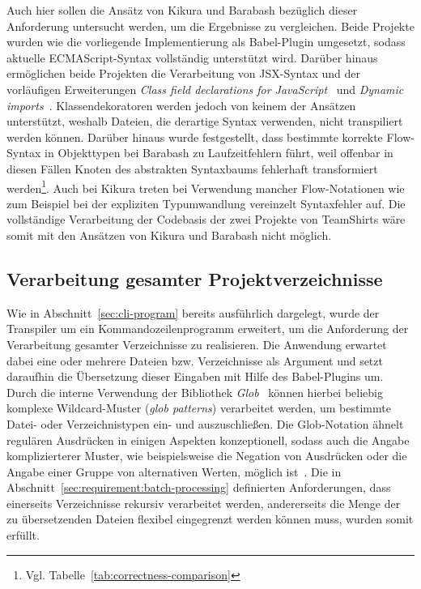 Auch hier sollen die Ansätz von Kikura und Barabash bezüglich dieser Anforderung untersucht werden, um die Ergebnisse zu vergleichen. Beide Projekte wurden wie die vorliegende Implementierung als Babel-Plugin umgesetzt, sodass aktuelle ECMAScript-Syntax vollständig unterstützt wird. Darüber hinaus ermöglichen beide Projekten die Verarbeitung von JSX-Syntax und der vorläufigen Erweiterungen \textit{Class field declarations for JavaScript}~\autocite{ES_PROPOSAL:CLASS_FIELDS} und \textit{Dynamic imports}~\autocite{ES_PROPOSAL:DYNAMIC_IMPORTS}. Klassendekoratoren werden jedoch von keinem der Ansätzen unterstützt, weshalb Dateien, die derartige Syntax verwenden, nicht transpiliert werden können. Darüber hinaus wurde festgestellt, dass bestimmte korrekte Flow-Syntax in Objekttypen bei Barabash zu Laufzeitfehlern führt, weil offenbar in diesen Fällen Knoten des abstrakten Syntaxbaums fehlerhaft transformiert werden\footnote{Vgl. Tabelle~\ref{tab:correctness-comparison}}. Auch bei Kikura treten bei Verwendung mancher Flow-Notationen wie zum Beispiel bei der expliziten Typumwandlung vereinzelt Syntaxfehler auf. Die vollständige Verarbeitung der Codebasis der zwei Projekte von TeamShirts wäre somit mit den Ansätzen von Kikura und Barabash nicht möglich.

\subsection{Verarbeitung gesamter Projektverzeichnisse}

Wie in Abschnitt~\ref{sec:cli-program} bereits ausführlich dargelegt, wurde der Transpiler um ein Kommandozeilenprogramm erweitert, um die Anforderung der Verarbeitung gesamter Verzeichnisse zu realisieren. Die Anwendung erwartet dabei eine oder mehrere Dateien bzw. Verzeichnisse als Argument und setzt daraufhin die Übersetzung dieser Eingaben mit Hilfe des Babel-Plugins um.
Durch die interne Verwendung der Bibliothek \textit{Glob}~\autocite{NPM:GLOB} können hierbei beliebig komplexe Wildcard-Muster (\textit{glob patterns}) verarbeitet werden, um bestimmte Datei- oder Verzeichnistypen ein- und auszuschließen. Die Glob-Notation ähnelt regulären Ausdrücken in einigen Aspekten konzeptionell, sodass auch die Angabe komplizierterer Muster, wie beispielsweise die Negation von Ausdrücken oder die Angabe einer Gruppe von alternativen Werten, möglich ist~\autocite{MAN:GLOB}.
Die in Abschnitt~\ref{sec:requirement:batch-processing} definierten Anforderungen, dass einerseits Verzeichnisse rekursiv verarbeitet werden, andererseits die Menge der zu übersetzenden Dateien flexibel eingegrenzt werden können muss, wurden somit erfüllt.

